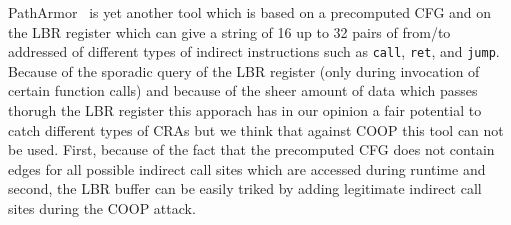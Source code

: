 PathArmor~\cite{veen:cfi} is yet another tool which is based on a precomputed CFG and on the LBR register which can give a string of 16 up to
32 pairs of from/to addressed of different types of indirect instructions such as \texttt{call}, \texttt{ret}, and \texttt{jump}. 
Because of the sporadic query of the LBR register (only during invocation of certain function calls) and because of the sheer amount of 
data which passes thorugh the LBR register this apporach has in our opinion a fair potential to catch different types of CRAs but
we think that against COOP this tool can not be used. First, because of the fact that the precomputed CFG does not contain edges for all
possible indirect call sites which are accessed during runtime and second, the LBR buffer can be easily triked by adding
legitimate indirect call sites  during the COOP attack.

